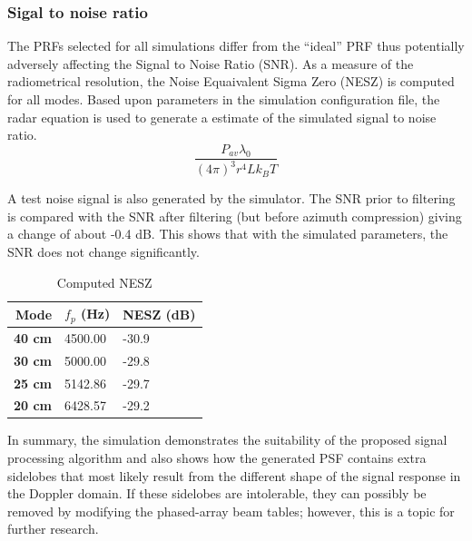 \subsubsection{Sigal to noise ratio}
The PRFs selected for all simulations differ from the ``ideal'' PRF thus potentially adversely affecting the Signal to Noise Ratio (SNR). As a measure of the radiometrical resolution, the Noise Equaivalent Sigma Zero (NESZ) is computed for all modes. 
Based upon parameters in the simulation configuration file, the radar equation is used to generate a estimate of the simulated signal to noise ratio. 
\begin{equation}
 \frac{P_{av}\lambda_0}{(4\pi)^3r^4Lk_BT}
\end{equation}

A test noise signal is also generated by the simulator. The SNR prior to filtering is compared with the SNR after filtering (but before azimuth compression) giving a change of about -0.4 dB. This shows that with the simulated parameters, the SNR does not change significantly.
\begin{table}[ht!]
\begin{center}
 \caption{Computed NESZ}
 \label{tb:nesz}
 \begin{tabular}{r|l|l}
 {\bf Mode} & {\bf $f_p$} (Hz)& {\bf NESZ} (dB)\\\hline
 {\bf 40 cm} & 4500.00 & -30.9\\\hline
 {\bf 30 cm} & 5000.00 & -29.8\\\hline
 {\bf 25 cm} & 5142.86 & -29.7\\\hline
 {\bf 20 cm} & 6428.57 & -29.2\\\hline
 \end{tabular}
 \end{center}
\end{table}
\par
In summary, the simulation demonstrates the suitability of the proposed signal processing algorithm and also shows how the generated PSF contains extra sidelobes that most likely result from the different shape of the signal response in the Doppler domain. If these sidelobes are intolerable, they can possibly be removed by modifying the phased-array beam tables; however, this is a topic for further research.
\clearpage
%

